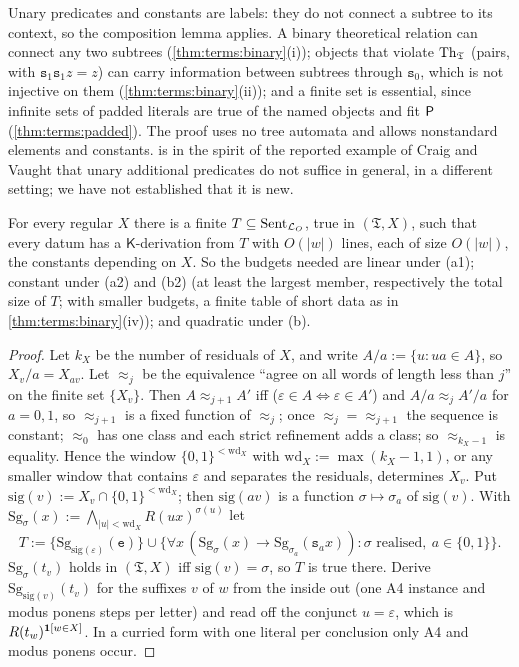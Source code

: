 Unary predicates and constants are labels: they do not connect a subtree to its context, so the composition lemma applies. A binary theoretical relation can connect any two subtrees (\cref{thm:terms:binary}(i)); objects that violate $\mathrm{Th}_{\mathfrak{T}}$ (pairs, with $\mathtt s_1\mathtt s_1z=z$) can carry information between subtrees through $\mathtt s_0$, which is not injective on them (\cref{thm:terms:binary}(ii)); and a finite set is essential, since infinite sets of padded literals are true of the named objects and fit $\mathsf{P}$ (\cref{thm:terms:padded}). The proof uses no tree automata and allows nonstandard elements and constants.  is in the spirit of the reported example of Craig and Vaught that unary additional predicates do not suffice in general, in a different setting; we have not established that it is new.

\begin{theorem}\label{thm:terms:everyregular}
For every regular $X$ there is a finite $T\subseteq\mathrm{Sent}_{\mathcal{L}_{O}}$, true in $(\mathfrak T,X)$, such that every datum has a $\mathsf K$-derivation from $T$ with $O(\lvert w\rvert)$ lines, each of size $O(\lvert w\rvert)$, the constants depending on $X$. So the budgets needed are linear under (a1); constant under (a2) and (b2) (at least the largest member, respectively the total size of $T$; with smaller budgets, a finite table of short data as in \cref{thm:terms:binary}(iv)); and quadratic under (b).
\end{theorem}

\begin{proof}
Let $k_X$ be the number of residuals of $X$, and write $A/a:=\{u:ua\in A\}$, so $X_v/a=X_{av}$. Let $\approx_j$ be the equivalence ``agree on all words of length less than $j$'' on the finite set $\{X_v\}$. Then $A\approx_{j+1}A'$ iff ($\varepsilon\in A\Leftrightarrow\varepsilon\in A'$) and $A/a\approx_jA'/a$ for $a=0,1$, so $\approx_{j+1}$ is a fixed function of $\approx_j$; once $\approx_j=\approx_{j+1}$ the sequence is constant; $\approx_0$ has one class and each strict refinement adds a class; so $\approx_{k_X-1}$ is equality. Hence the window $\{0,1\}^{<\mathrm{wd}_X}$ with $\mathrm{wd}_X:=\max(k_X-1,1)$, or any smaller window that contains $\varepsilon$ and separates the residuals, determines $X_v$. Put $\mathrm{sig}(v):=X_v\cap\{0,1\}^{<\mathrm{wd}_X}$; then $\mathrm{sig}(av)$ is a function $\sigma\mapsto\sigma_a$ of $\mathrm{sig}(v)$. With $\mathrm{Sg}_\sigma(x):=\bigwedge_{\lvert u\rvert<\mathrm{wd}_X}R(ux)^{\sigma(u)}$ let
\[
T:=\{\mathrm{Sg}_{\mathrm{sig}(\varepsilon)}(\mathtt e)\}\cup\{\forall x\,(\mathrm{Sg}_\sigma(x)\to\mathrm{Sg}_{\sigma_a}(\mathtt s_ax)):\sigma\text{ realised},\ a\in\{0,1\}\}.
\]
$\mathrm{Sg}_\sigma(t_v)$ holds in $(\mathfrak T,X)$ iff $\mathrm{sig}(v)=\sigma$, so $T$ is true there. Derive $\mathrm{Sg}_{\mathrm{sig}(v)}(t_v)$ for the suffixes $v$ of $w$ from the inside out (one A4 instance and modus ponens steps per letter) and read off the conjunct $u=\varepsilon$, which is $R(t_w)^{\mathbf{1}[w\in X]}$. In a curried form with one literal per conclusion only A4 and modus ponens occur.
\end{proof}

